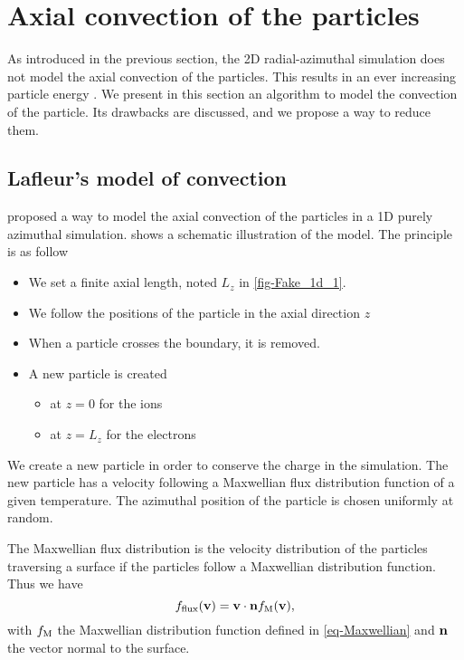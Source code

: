 
\section{Axial convection of the particles}
  \label{sec-reinjectionnoise}

  As introduced in the previous section, the \ac{2D} radial-azimuthal simulation does not model the axial convection of the particles.
  This results in an ever increasing particle energy \citep{lafleur2016a,heron2013}.
  We present in this section an algorithm to model the convection of the particle.
  Its drawbacks are discussed, and we propose a way to reduce them.
  
  \subsection{Lafleur's model of convection}

    \citet{lafleur2016a} proposed a way to model the axial convection of the particles in a \ac{1D} purely azimuthal simulation.
     shows a schematic illustration of the model.
    The principle is as follow
    \begin{itemize}
      \item We set a finite axial length, noted $L_z$ in \cref{fig-Fake_1d_1}.
      \item We follow the positions of the particle in the axial direction $z$
      \item When a particle crosses the boundary, it is removed.
      \item A new particle is created
      \begin{itemize}
        \item at $z=0$ for the ions
        \item  at $z=L_z$ for the electrons
      \end{itemize}
    \end{itemize}

    We create a new particle in order to conserve the charge in the simulation.
    The new particle has a velocity following a Maxwellian flux distribution function of a given temperature.
    The azimuthal position of the particle is chosen uniformly at random.

    The Maxwellian flux distribution is the velocity distribution of the particles traversing a surface if the particles follow a Maxwellian distribution function. Thus we have
    \begin{equation} \label{eq-Maxwflux} 
      f_{\rm flux}({\mathbf v}) = {\mathbf v} \cdot {\mathbf n} f_{\rm M}({\mathbf v}),
    \end{equation}
    with $f_{\rm M}$ the Maxwellian distribution function defined in \cref{eq-Maxwellian} and ${\mathbf n}$ the vector normal to the surface.

